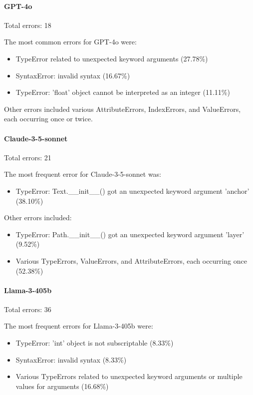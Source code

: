 \documentclass{article}
\begin{document}
\paragraph{GPT-4o}
Total errors: 18

The most common errors for GPT-4o were:
\begin{itemize}
    \item TypeError related to unexpected keyword arguments (27.78\%)
    \item SyntaxError: invalid syntax (16.67\%)
    \item TypeError: 'float' object cannot be interpreted as an integer (11.11\%)
\end{itemize}

Other errors included various AttributeErrors, IndexErrors, and ValueErrors, each occurring once or twice.

\paragraph{Claude-3-5-sonnet}
Total errors: 21

The most frequent error for Claude-3-5-sonnet was:
\begin{itemize}
    \item TypeError: Text.\_\_init\_\_() got an unexpected keyword argument 'anchor' (38.10\%)
\end{itemize}

Other errors included:
\begin{itemize}
    \item TypeError: Path.\_\_init\_\_() got an unexpected keyword argument 'layer' (9.52\%)
    \item Various TypeErrors, ValueErrors, and AttributeErrors, each occurring once (52.38\%)
\end{itemize}

\paragraph{Llama-3-405b}
Total errors: 36

The most frequent errors for Llama-3-405b were:
\begin{itemize}
    \item TypeError: 'int' object is not subscriptable (8.33\%)
    \item SyntaxError: invalid syntax (8.33\%)
    \item Various TypeErrors related to unexpected keyword arguments or multiple values for arguments (16.68\%)
\end{itemize}
\end{document}
